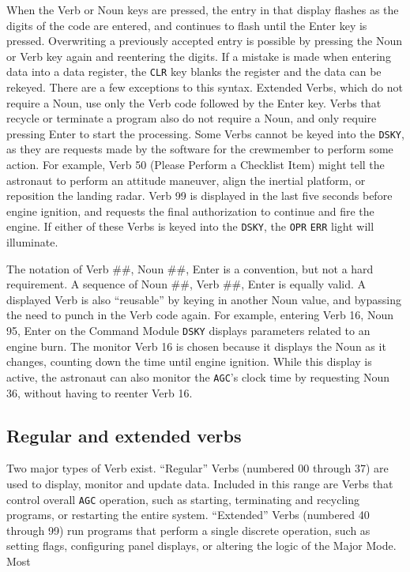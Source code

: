 \documentclass[refcap, oxford]{ahsan}
\begin{document}
When the Verb or Noun keys are pressed, the entry in that display flashes as the digits of the code are entered, and continues to flash until the Enter key is pressed. Overwriting a previously accepted entry is possible by pressing the Noun or Verb key again and reentering the digits. If a mistake is made when entering data into a data register, the \texttt{CLR} key blanks the register and the data can be rekeyed. There are a few exceptions to this syntax. Extended Verbs, which do not require a Noun, use only the Verb code followed by the Enter key. Verbs that recycle or terminate a program also do not require a Noun, and only require pressing Enter to start the processing. Some Verbs cannot be keyed into the \texttt{DSKY}, as they are requests made by the software for the crewmember to perform some action. For example, Verb 50 (Please Perform a Checklist Item) might tell the astronaut to perform an attitude maneuver, align the inertial platform, or reposition the landing radar. Verb 99 is displayed in the last five seconds before engine ignition, and requests the final authorization to continue and fire the engine. If either of these Verbs is keyed into the \texttt{DSKY}, the \texttt{OPR} \texttt{ERR} light will illuminate.

The notation of Verb \#\#, Noun \#\#, Enter is a convention, but not a hard requirement. A sequence of Noun \#\#, Verb \#\#, Enter is equally valid. A displayed Verb is also ``reusable'' by keying in another Noun value, and bypassing the need to punch in the Verb code again. For example, entering Verb 16, Noun 95, Enter on the Command Module \texttt{DSKY} displays parameters related to an engine burn. The monitor Verb 16 is chosen because it displays the Noun as it changes, counting down the time until engine ignition. While this display is active, the astronaut can also monitor the \texttt{AGC}'s clock time by requesting Noun 36, without having to reenter Verb 16.


\subsection{Regular and extended verbs}
Two major types of Verb exist. ``Regular'' Verbs (numbered 00 through 37) are used to display, monitor and update data. Included in this range are Verbs that control overall \texttt{AGC} operation, such as starting, terminating and recycling programs, or restarting the entire system. ``Extended'' Verbs (numbered 40 through 99) run programs that perform a single discrete operation, such as setting flags, configuring panel displays, or altering the logic of the Major Mode. Most
\end{document}
